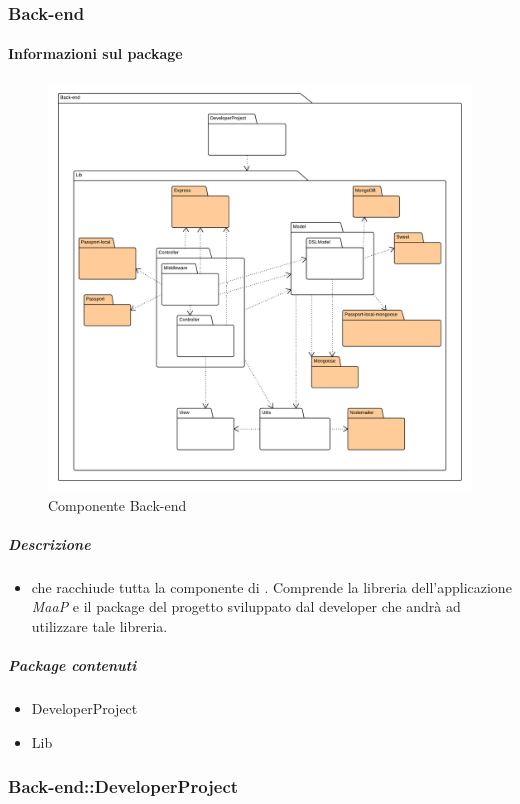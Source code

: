 
	\subsubsection{Back-end}
	\paragraph{Informazioni sul package} 
		\begin{figure}[H] 
			\begin{center} 
				\includegraphics[width=\textwidth]{uml/package/Back-end.png}  
				\caption{Componente Back-end}
			\end{center}  
		\end{figure} 
	\subparagraph{Descrizione} 
		\begin{itemize}
		\item[]  che racchiude tutta la componente di . Comprende la libreria dell'applicazione \textit{MaaP} e il package del progetto sviluppato dal developer che andrà ad utilizzare tale libreria.
		\end{itemize} 
		\subparagraph{Package contenuti} 
		\begin{itemize}
				\item DeveloperProject
				\item Lib
		\end{itemize}
	\subsubsection{Back-end::DeveloperProject}
